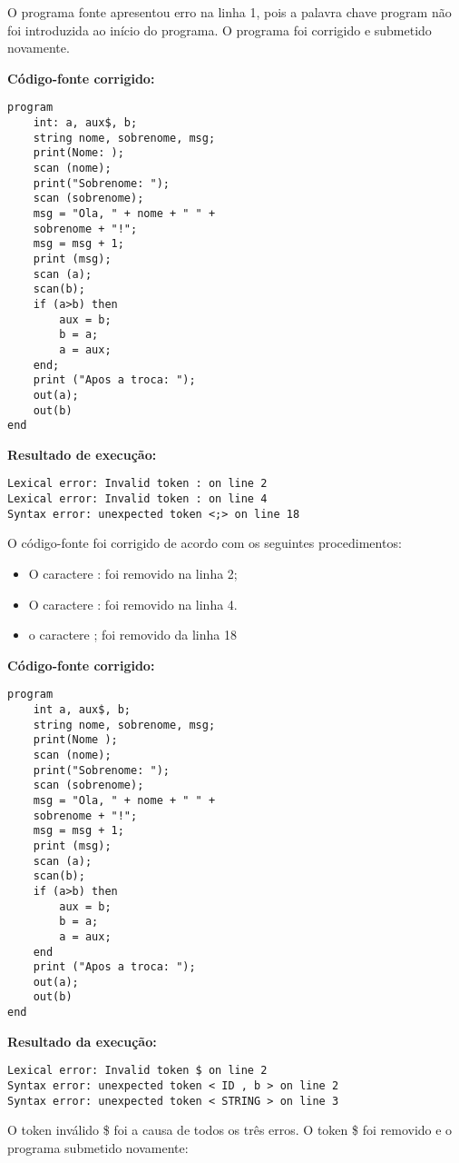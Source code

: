 O programa fonte apresentou erro na linha 1, pois a palavra chave program não foi introduzida ao início do programa. O programa foi corrigido e submetido novamente.

\textbf{Código-fonte corrigido:}

\begin{lstlisting}
program
	int: a, aux$, b;
	string nome, sobrenome, msg;
	print(Nome: );
	scan (nome);
	print("Sobrenome: ");
	scan (sobrenome);
	msg = "Ola, " + nome + " " +
	sobrenome + "!";
	msg = msg + 1;
	print (msg);
	scan (a);
	scan(b);
	if (a>b) then
		aux = b;
		b = a;
		a = aux;
	end;
	print ("Apos a troca: ");
	out(a);
	out(b)
end
\end{lstlisting}

\textbf{Resultado de execução:}

 \begin{lstlisting}
Lexical error: Invalid token : on line 2
Lexical error: Invalid token : on line 4
Syntax error: unexpected token <;> on line 18
\end{lstlisting}

O código-fonte foi corrigido de acordo com os seguintes procedimentos:

\begin{itemize}
    \item O caractere : foi removido na linha 2;
    
    \item O caractere : foi removido na linha 4.
    
    \item o caractere ; foi removido da linha 18
\end{itemize}

\textbf{Código-fonte corrigido:}
\begin{lstlisting}
program	
	int a, aux$, b;
	string nome, sobrenome, msg;
	print(Nome );
	scan (nome);
	print("Sobrenome: ");
	scan (sobrenome);
	msg = "Ola, " + nome + " " +
	sobrenome + "!";
	msg = msg + 1;
	print (msg);
	scan (a);
	scan(b);
	if (a>b) then
		aux = b;
		b = a;
		a = aux;
	end
	print ("Apos a troca: ");
	out(a);
	out(b)
end
\end{lstlisting}

\textbf{Resultado da execução:}
\begin{lstlisting}
Lexical error: Invalid token $ on line 2
Syntax error: unexpected token < ID , b > on line 2
Syntax error: unexpected token < STRING > on line 3
\end{lstlisting}

O token inválido \$ foi a causa de todos os três erros. O token \$ foi removido e o programa submetido novamente:


